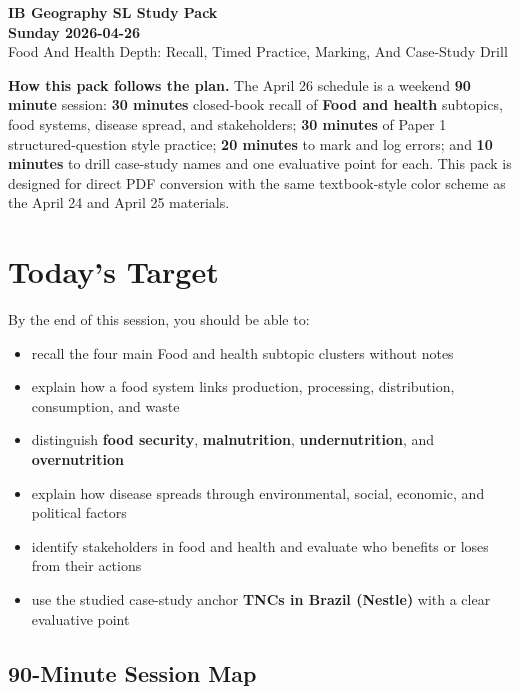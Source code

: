 \documentclass[11pt,a4paper]{article}
\newcommand{\term}[1]{\textcolor{HeadingBlue}{\textbf{#1}}}
\newcommand{\boxnote}[3]{%
\noindent\colorbox{#1}{%
  \begin{minipage}{0.965\textwidth}
  \sffamily
  \textbf{\textcolor{HeadingBlue}{#2}} #3
  \end{minipage}
}}
\begin{document}
\begin{center}
  {\sffamily\bfseries\color{HeadingBlue}\LARGE IB Geography SL Study Pack}\\[0.25em]
  {\sffamily\bfseries\color{AccentTeal}\Large Sunday 2026-04-26}\\[0.35em]
  {\sffamily\color{TextInk}Food And Health Depth: Recall, Timed Practice, Marking, And Case-Study Drill}
\end{center}

\vspace{0.5em}

\boxnote{SoftBlue}{How this pack follows the plan.}{The April 26 schedule is a
weekend \term{90 minute} session: \term{30 minutes} closed-book recall of
\term{Food and health} subtopics, food systems, disease spread, and
stakeholders; \term{30 minutes} of Paper 1 structured-question style practice;
\term{20 minutes} to mark and log errors; and \term{10 minutes} to drill
case-study names and one evaluative point for each. This pack is designed for
direct PDF conversion with the same textbook-style color scheme as the April 24
and April 25 materials.}

\section{Today's Target}

By the end of this session, you should be able to:

\begin{itemize}
  \item recall the four main Food and health subtopic clusters without notes
  \item explain how a food system links production, processing, distribution,
  consumption, and waste
  \item distinguish \term{food security}, \term{malnutrition},
  \term{undernutrition}, and \term{overnutrition}
  \item explain how disease spreads through environmental, social, economic,
  and political factors
  \item identify stakeholders in food and health and evaluate who benefits or
  loses from their actions
  \item use the studied case-study anchor \term{TNCs in Brazil (Nestle)} with a
  clear evaluative point
\end{itemize}

\subsection{90-Minute Session Map}
\end{document}
